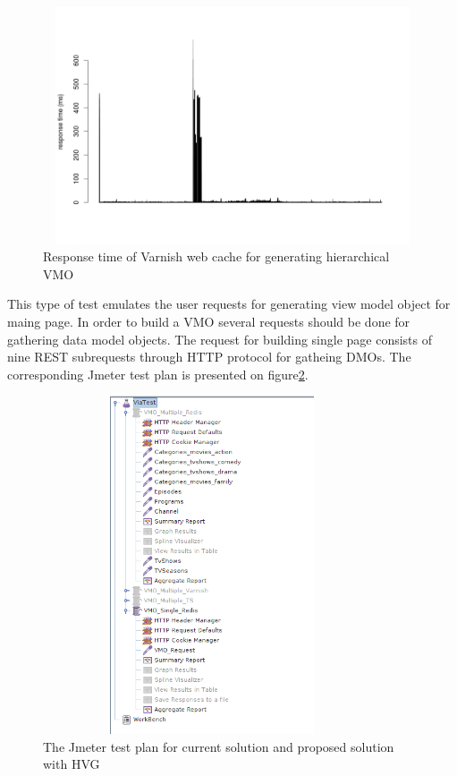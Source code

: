 \begin{figure}[h!]
    \centering
    \includegraphics[width=15cm,height=7cm,keepaspectratio]{images/vmo_varnish_mult.png}
    \caption{Response time of Varnish web cache for generating hierarchical VMO}
    \label{fig:vmo_varnish_mult}
\end{figure}


This type of test emulates the user requests for generating view model object for maing page. In order to build a VMO several requests should be done for gathering data model objects. The request for building single page consists of nine REST subrequests through HTTP protocol for gatheing DMOs. The corresponding Jmeter test plan is presented on figure\ref{fig:vmo_testplan}.

\begin{figure}[h!]
    \centering
    \includegraphics[width=10cm,height=10cm,keepaspectratio]{images/vmo_testplan.png}
    \caption{The Jmeter test plan for current solution and proposed solution with HVG}
    \label{fig:vmo_testplan}
\end{figure}



